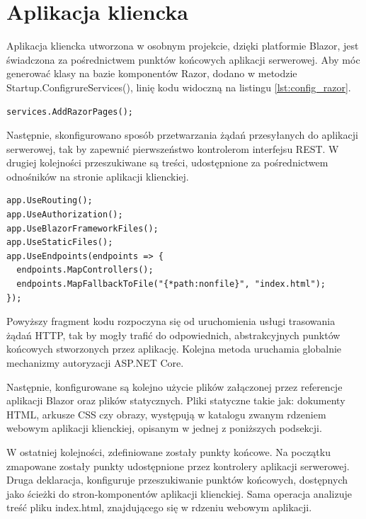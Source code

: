 \section{Aplikacja kliencka}

Aplikacja kliencka utworzona w osobnym projekcie, dzięki platformie Blazor, jest świadczona za pośrednictwem punktów końcowych aplikacji serwerowej. Aby móc generować klasy na bazie komponentów Razor, dodano w metodzie Startup.ConfigrureServices(), linię kodu widoczną na listingu \ref{lst:config_razor}.

\begin{lstlisting}[language=CSharp, caption={Rejestracja serwisu, obsługującego komponenty Razor, w metodzie Startup.ConfigureServices()}, label=lst:config_razor]
services.AddRazorPages();
\end{lstlisting}

Następnie, skonfigurowano sposób przetwarzania żądań przesyłanych do aplikacji serwerowej, tak by zapewnić pierwszeństwo kontrolerom interfejsu REST. W drugiej kolejności przeszukiwane są treści, udostępnione za pośrednictwem odnośników na stronie aplikacji klienckiej.

\begin{lstlisting}[language=CSharp, caption={Konfiguracja punktów końcowych aplikacji serwerowej, w metodzie Startup.Configure()}, label=lst:config_endpoints]
app.UseRouting();
app.UseAuthorization();
app.UseBlazorFrameworkFiles();
app.UseStaticFiles();
app.UseEndpoints(endpoints => {
  endpoints.MapControllers();
  endpoints.MapFallbackToFile("{*path:nonfile}", "index.html");
});
\end{lstlisting}

Powyższy fragment kodu rozpoczyna się od uruchomienia usługi trasowania żądań HTTP, tak by mogły trafić do odpowiednich, abstrakcyjnych punktów końcowych stworzonych przez aplikację. Kolejna metoda uruchamia globalnie mechanizmy autoryzacji ASP.NET Core.

Następnie, konfigurowane są kolejno użycie plików załączonej przez referencje aplikacji Blazor oraz plików statycznych. Pliki statyczne takie jak: dokumenty HTML, arkusze CSS czy obrazy, występują w katalogu zwanym rdzeniem webowym aplikacji klienckiej, opisanym w jednej z poniższych podsekcji.

W ostatniej kolejności, zdefiniowane zostały punkty końcowe. Na początku zmapowane zostały punkty udostępnione przez kontrolery aplikacji serwerowej. Druga deklaracja, konfiguruje przeszukiwanie punktów końcowych, dostępnych jako ścieżki do stron-komponentów aplikacji klienckiej. Sama operacja analizuje treść pliku index.html, znajdującego się w rdzeniu webowym aplikacji.

